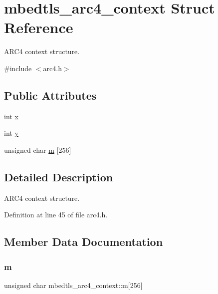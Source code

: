 \hypertarget{structmbedtls__arc4__context}{}\section{mbedtls\+\_\+arc4\+\_\+context Struct Reference}
\label{structmbedtls__arc4__context}


A\+R\+C4 context structure.  




{\ttfamily \#include $<$arc4.\+h$>$}

\subsection*{Public Attributes}
\begin{DoxyCompactItemize}
\item 
int \mbox{\hyperlink{structmbedtls__arc4__context_a35ada04bd0e0ebb3c91fe0a7be91d62c}{x}}
\item 
int \mbox{\hyperlink{structmbedtls__arc4__context_a53d6a6d70c2b3ef5cd4467ae32e21429}{y}}
\item 
unsigned char \mbox{\hyperlink{structmbedtls__arc4__context_a18aed220cbc1645d368721b380354688}{m}} \mbox{[}256\mbox{]}
\end{DoxyCompactItemize}


\subsection{Detailed Description}
A\+R\+C4 context structure. 

Definition at line 45 of file arc4.\+h.



\subsection{Member Data Documentation}
\mbox{\label{structmbedtls__arc4__context_a18aed220cbc1645d368721b380354688}} 
\subsubsection{\texorpdfstring{m}{m}}
{\footnotesize\ttfamily unsigned char mbedtls\+\_\+arc4\+\_\+context\+::m\mbox{[}256\mbox{]}}

